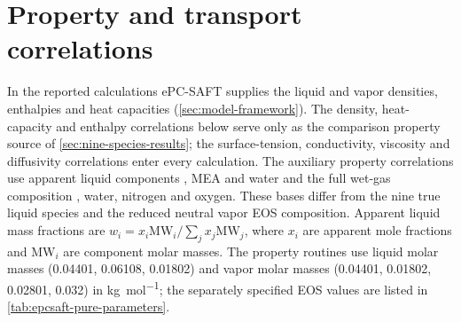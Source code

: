 \section{Property and transport correlations}\label{sec:properties}
In the reported calculations ePC-SAFT supplies the liquid and vapor densities, enthalpies and heat capacities (\cref{sec:model-framework}).
The density, heat-capacity and enthalpy correlations below serve only as the comparison property source of \cref{sec:nine-species-results}; the surface-tension, conductivity, viscosity and diffusivity correlations enter every calculation.
The auxiliary property correlations use apparent liquid components \COtwo, MEA and water and the full wet-gas composition \COtwo, water, nitrogen and oxygen.
These bases differ from the nine true liquid species and the reduced neutral vapor EOS composition.
Apparent liquid mass fractions are \(w_i=x_i\mathrm{MW}_i/\sum_jx_j\mathrm{MW}_j\), where \(x_i\) are apparent mole fractions and \(\mathrm{MW}_i\) are component molar masses.
The property routines use liquid molar masses (0.04401, 0.06108, 0.01802) and vapor molar masses (0.04401, 0.01802, 0.02801, 0.032) in \unit{kg.mol^{-1}}; the separately specified EOS values are listed in \cref{tab:epcsaft-pure-parameters}.

